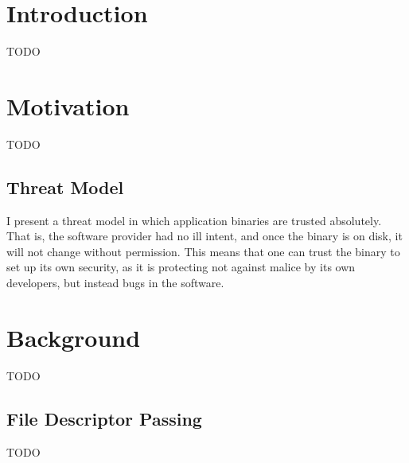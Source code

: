 \documentclass[sigplan]{acmart}
\begin{document}



\maketitle

\section{Introduction}

TODO

\section{Motivation}

TODO

\subsection{Threat Model}

I present a threat model in which application binaries are trusted absolutely. That is, the software provider had no ill intent, and once the binary is on disk, it will not change without permission. This means that one can trust the binary to set up its own security, as it is protecting not against malice by its own developers, but instead bugs in the software.

\section{Background}

TODO

\subsection{File Descriptor Passing}
\label{section:file-descriptor-passing}

TODO
\end{document}
